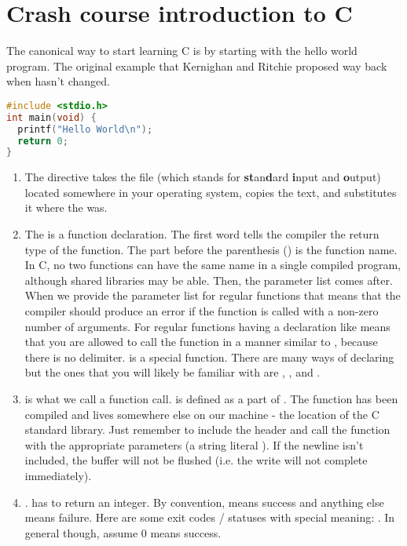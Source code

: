 \section{Crash course introduction to C}

The canonical way to start learning C is by starting with the \gls{hello world} program.
The original example that Kernighan and Ritchie proposed way back when hasn't changed.

\begin{lstlisting}[language=C]
#include <stdio.h>
int main(void) {
  printf("Hello World\n");
  return 0;
}
\end{lstlisting}

\begin{enumerate}
	\item The  directive takes the file  (which stands for \textbf{st}an\textbf{d}ard \textbf{i}nput and \textbf{o}utput) located somewhere in your operating system, copies the text, and substitutes it where the  was.
	\item The  is a function declaration.
    The first word  tells the compiler the return type of the function.
    The part before the parenthesis () is the function name.
    In C, no two functions can have the same name in a single compiled program, although shared libraries may be able.
    Then, the parameter list comes after.
    When we provide the parameter list for regular functions  that means that the compiler should produce an error if the function is called with a non-zero number of arguments.
    For regular functions having a declaration like  means that you are allowed to call the function in a manner similar to , because there is no delimiter.
     is a special function.
    There are many ways of declaring  but the ones that you will likely be familiar with are , , and .
	\item {} is what we call a function call.
     is defined as a part of .
    The function has been compiled and lives somewhere else on our machine - the location of the C standard library.
    Just remember to include the header and call the function with the appropriate parameters (a string literal ).
    If the newline isn't included, the buffer will not be flushed (i.e. the write will not complete immediately).
	\item {}.
     has to return an integer.
    By convention,  means success and anything else means failure.
    Here are some exit codes / statuses with special meaning: .
    In general though, assume 0 means success.
\end{enumerate}

